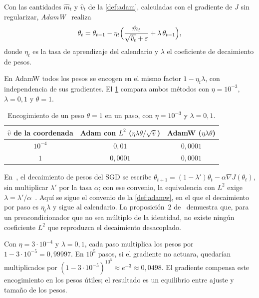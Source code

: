 \begin{definicion}[AdamW]\label{def:adamw}
Con las cantidades $\hat m_t$ y $\hat v_t$ de la \cref{def:adam}, calculadas con el gradiente de $J$ sin regularizar, \emph{AdamW}~\cite[algoritmo~2]{adamw} realiza
\[
\theta_t=\theta_{t-1}-\eta_t\Bigl(\frac{\hat m_t}{\sqrt{\hat v_t}+\varepsilon}+\lambda\,\theta_{t-1}\Bigr),
\]
donde $\eta_t$ es la tasa de aprendizaje del calendario y $\lambda$ el coeficiente de decaimiento de pesos.
\end{definicion}

En AdamW todos los pesos se encogen en el mismo factor $1-\eta_t\lambda$, con independencia de sus gradientes. El \cref{tab:adamw} compara ambos métodos con $\eta=10^{-3}$, $\lambda=0{,}1$ y $\theta=1$.

\begin{table}[h]
\centering\small
\caption{Encogimiento de un peso $\theta=1$ en un paso, con $\eta=10^{-3}$ y $\lambda=0{,}1$.}\label{tab:adamw}
\begin{tabular}{@{}ccc@{}}
\toprule
$\hat v$ de la coordenada & Adam con $L^{2}$ ($\eta\lambda\theta/\sqrt{\hat v}$) & AdamW ($\eta\lambda\theta$) \\
\midrule
$10^{-4}$ & $0{,}01$ & $0{,}0001$ \\
$1$ & $0{,}0001$ & $0{,}0001$ \\
\bottomrule
\end{tabular}
\end{table}

\begin{observacion}[Convenios]
En~\cite{adamw}, el decaimiento de pesos del SGD se escribe $\theta_{t+1}=(1-\lambda')\theta_t-\alpha\nabla J(\theta_t)$, sin multiplicar $\lambda'$ por la tasa $\alpha$; con ese convenio, la equivalencia con $L^{2}$ exige $\lambda=\lambda'/\alpha$~\cite[proposición~1]{adamw}. Aquí se sigue el convenio de la \cref{def:adamw}, en el que el decaimiento por paso es $\eta_t\lambda$ y sigue al calendario. La proposición~2 de~\cite{adamw} demuestra que, para un preacondicionador que no sea múltiplo de la identidad, no existe ningún coeficiente $L^{2}$ que reproduzca el decaimiento desacoplado.
\end{observacion}

\begin{ejemplo}
Con $\eta=3\cdot 10^{-4}$ y $\lambda=0{,}1$, cada paso multiplica los pesos por $1-3\cdot 10^{-5}=0{,}99997$. En $10^{5}$ pasos, si el gradiente no actuara, quedarían multiplicados por $(1-3\cdot 10^{-5})^{10^{5}}\approx e^{-3}\approx 0{,}0498$. El gradiente compensa este encogimiento en los pesos útiles; el resultado es un equilibrio entre ajuste y tamaño de los pesos.
\end{ejemplo}

